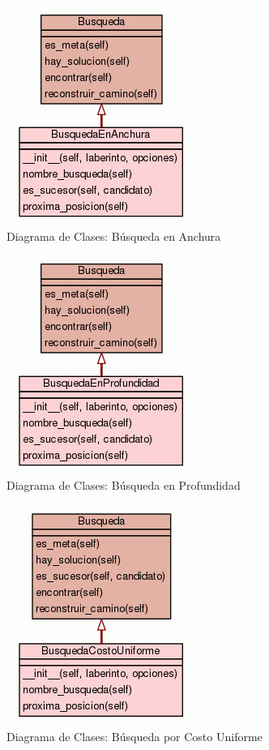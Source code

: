 \documentclass[letter, titlepage, 10pt]{article}
\begin{document}
\begin{figure}[H]
    \begin{center}
        \includegraphics[scale = 0.5]{images/diagram_bea}
        \caption{Diagrama de Clases: Búsqueda en Anchura}
    \end{center}
\end{figure}

\begin{figure}[H]
    \begin{center}
        \includegraphics[scale = 0.5]{images/diagram_bep}
        \caption{Diagrama de Clases: Búsqueda en Profundidad}
    \end{center}
\end{figure}

\begin{figure}[H]
    \begin{center}
        \includegraphics[scale = 0.5]{images/diagram_bcu}
        \caption{Diagrama de Clases: Búsqueda por Costo Uniforme}
    \end{center}
\end{figure}
\end{document}
